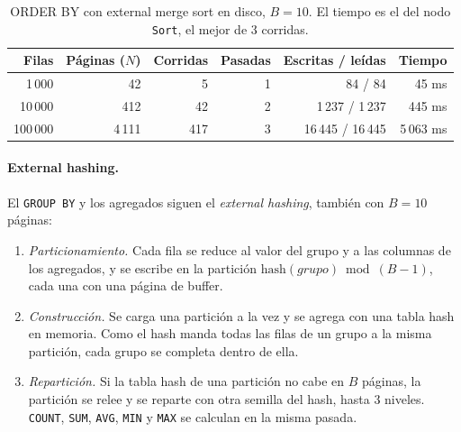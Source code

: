 \documentclass[11pt,a4paper]{article}
\begin{document}
\begin{table}[H]
\centering
\small
\begin{tabular}{rrrrrr}
\toprule
Filas & Páginas ($N$) & Corridas & Pasadas & Escritas / leídas & Tiempo \\
\midrule
1\,000 & 42 & 5 & 1 & 84 / 84 & 45 ms \\
10\,000 & 412 & 42 & 2 & 1\,237 / 1\,237 & 445 ms \\
100\,000 & 4\,111 & 417 & 3 & 16\,445 / 16\,445 & 5\,063 ms \\
\bottomrule
\end{tabular}
\caption{ORDER BY con external merge sort en disco, $B = 10$. El tiempo es el del nodo \texttt{Sort}, el mejor de 3 corridas.}
\label{tab:sort-externo}
\end{table}

\paragraph{External hashing.} El \texttt{GROUP BY} y los agregados siguen el \emph{external hashing}, también con $B = 10$ páginas:

\begin{enumerate}
  \item \emph{Particionamiento.} Cada fila se reduce al valor del grupo y a las columnas de los agregados, y se escribe en la partición $\mathrm{hash}(\mathit{grupo}) \bmod (B-1)$, cada una con una página de buffer.
  \item \emph{Construcción.} Se carga una partición a la vez y se agrega con una tabla hash en memoria. Como el hash manda todas las filas de un grupo a la misma partición, cada grupo se completa dentro de ella.
  \item \emph{Repartición.} Si la tabla hash de una partición no cabe en $B$ páginas, la partición se relee y se reparte con otra semilla del hash, hasta 3 niveles. \texttt{COUNT}, \texttt{SUM}, \texttt{AVG}, \texttt{MIN} y \texttt{MAX} se calculan en la misma pasada.
\end{enumerate}
\end{document}
